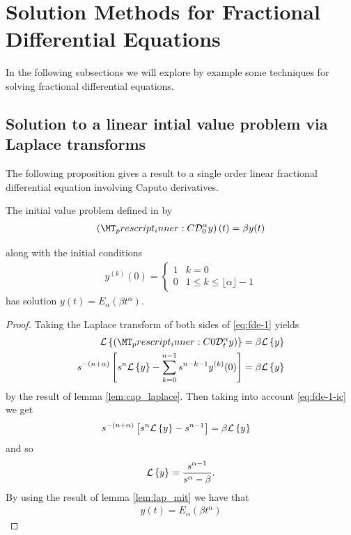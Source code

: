 \section{Solution Methods for Fractional Differential Equations}

In the following subsections we will explore by example some techniques for solving fractional differential equations.

\subsection{Solution to a linear intial value problem via Laplace transforms}
The following proposition gives a result to a single order linear fractional differential equation involving Caputo derivatives.
\begin{mdframed}[innertopmargin=10pt]
\begin{proposition}

	The initial value problem defined in by
	\begin{align}
        \label{eq:fde-1}
        \left( \prescript{C}{}{\mathcal{D}_0^\alpha}y \right)(t) = \beta y(t)
    \end{align}
    
    along with the initial conditions
    \begin{align}
        \label{eq:fde-1-ic}
        y^{(k)}(0) =
        \begin{cases}
        1 & k = 0 \\
        0 & 1 \leq k \leq \lfloor\alpha \rfloor - 1
        \end{cases}
    \end{align}
	has solution $ y(t) = E_\alpha \left( \beta t^\alpha \right) $.
\end{proposition}
\end{mdframed}
\begin{proof}
	Taking the Laplace transform of both sides of \eqref{eq:fde-1} yields
	\begin{align}
		\laplace{\capder{0}{t}{\alpha}{y}} &= \beta \laplace{y} \\
		s^{-(n+\alpha)} \left[s^n \laplace{y} - \sum_{k=0}^{n-1} s^{n-k-1} y^{(k)}(0) \right] &= \beta \laplace{y}
	\end{align}
	by the result of lemma \ref{lem:cap_laplace}. 
	Then taking into account \eqref{eq:fde-1-ic} we get
	\begin{align}
		s^{-(n+\alpha)} \left[s^n \mathcal{L} \left\{ y \right\} - s^{n-1}\right] &= \beta \mathcal{L} \left\{ y \right\}
	\end{align}
	and so 
	\begin{align}
		\mathcal{L} \left\{ y \right\} = \frac{s^{\alpha-1}}{s^\alpha - \beta}.
	\end{align}
	By using the result of lemma \ref{lem:lap_mit} we have that 
	\begin{align}
		y(t) = E_\alpha(\beta t^\alpha)
	\end{align}
\end{proof}
